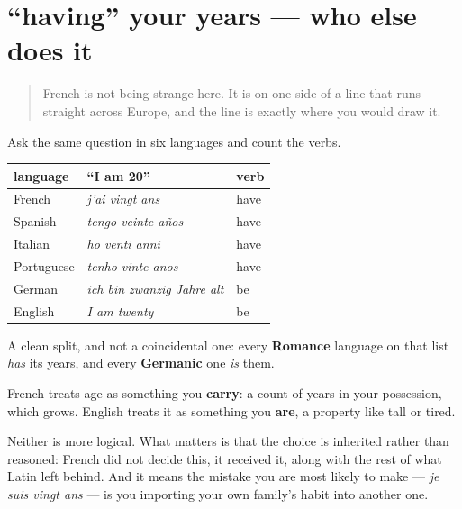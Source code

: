 \section[j'ai vingt ans / I am twenty]{\textquotedblleft{}having\textquotedblright{} your years — who else does it}

\label{lesson:FR-C14-avoir-etre-langues}



\begin{quote}
French is not being strange here. It is on one side of a line that runs straight across Europe, and the line is exactly where you would draw it.
\end{quote}

\begin{culture}
Ask the same question in six languages and count the verbs.

\noindent
\begin{tabularx}{\linewidth}{@{}>{\raggedright\arraybackslash}X>{\raggedright\arraybackslash}X>{\raggedright\arraybackslash}X@{}}
\toprule
\textbf{language} & \textbf{\textquotedblleft{}I am 20\textquotedblright{}} & \textbf{verb} \\
\midrule
French & \emph{j'ai vingt ans} & have \\
Spanish & \emph{tengo veinte años} & have \\
Italian & \emph{ho venti anni} & have \\
Portuguese & \emph{tenho vinte anos} & have \\
German & \emph{ich bin zwanzig Jahre alt} & be \\
English & \emph{I am twenty} & be \\
\bottomrule
\end{tabularx}

A clean split, and not a coincidental one: every \textbf{Romance} language on that list \emph{has} its years, and every \textbf{Germanic} one \emph{is} them.

French treats age as something you \textbf{carry}: a count of years in your possession, which grows. English treats it as something you \textbf{are}, a property like tall or tired.

Neither is more logical. What matters is that the choice is inherited rather than reasoned: French did not decide this, it received it, along with the rest of what Latin left behind. And it means the mistake you are most likely to make — \emph{je suis vingt ans} — is you importing your own family's habit into another one.
\end{culture}

